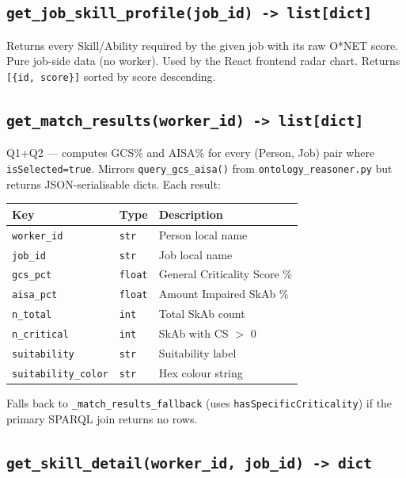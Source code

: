 ﻿\documentclass[12pt,a4paper]{article}
\begin{document}
\subsection{\texttt{get\_job\_skill\_profile(job\_id) -> list[dict]}}

Returns every Skill/Ability required by the given job with its raw O*NET score. Pure job-side data (no worker). Used by the React frontend radar chart. Returns \texttt{[\{id, score\}]} sorted by score descending.

\subsection{\texttt{get\_match\_results(worker\_id) -> list[dict]}}

Q1+Q2 --- computes GCS\% and AISA\% for every (Person, Job) pair where \texttt{isSelected=true}. Mirrors \texttt{query\_gcs\_aisa()} from \texttt{ontology\_reasoner.py} but returns JSON-serialisable dicts. Each result:

\begin{longtable}{@{}P{4cm}P{2.5cm}P{8cm}@{}}
\toprule
\textbf{Key} & \textbf{Type} & \textbf{Description} \\
\midrule
\endhead
\texttt{worker\_id} & \texttt{str} & Person local name \\
\texttt{job\_id} & \texttt{str} & Job local name \\
\texttt{gcs\_pct} & \texttt{float} & General Criticality Score \% \\
\texttt{aisa\_pct} & \texttt{float} & Amount Impaired SkAb \% \\
\texttt{n\_total} & \texttt{int} & Total SkAb count \\
\texttt{n\_critical} & \texttt{int} & SkAb with CS $>$ 0 \\
\texttt{suitability} & \texttt{str} & Suitability label \\
\texttt{suitability\_color} & \texttt{str} & Hex colour string \\
\bottomrule
\end{longtable}

Falls back to \texttt{\_match\_results\_fallback} (uses \texttt{hasSpecificCriticality}) if the primary SPARQL join returns no rows.

\subsection{\texttt{get\_skill\_detail(worker\_id, job\_id) -> dict}}
\end{document}
